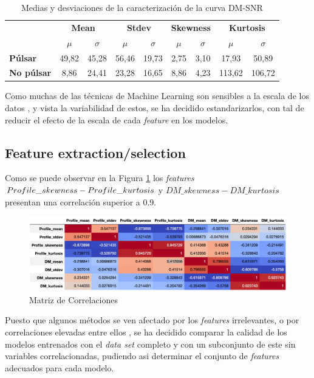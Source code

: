 \documentclass[a4paper]{article} %
\begin{document}
\begin{table}[H]
\centering
\begin{tabular}{l|c|c|c|c|c|c|c|c|}
\cline{2-9}
 & \multicolumn{2}{c|}{\textbf{Mean}} & \multicolumn{2}{c|}{\textbf{Stdev}} & \multicolumn{2}{c|}{\textbf{Skewness}} & \multicolumn{2}{c|}{\textbf{Kurtosis}} \\ \cline{2-9} 
 & $\mu$ & $\sigma$ & $\mu$ & $\sigma$ & $\mu$ & $\sigma$ & $\mu$ & $\sigma$ \\ \hline
\multicolumn{1}{|l|}{\textbf{Púlsar}} & 49,82 & 45,28 & 56,46 & 19,73 & 2,75 & 3,10 & 17,93 & 50,89 \\ \hline
\multicolumn{1}{|l|}{\textbf{No púlsar}} & 8,86 & 24,41 & 23,28 & 16,65 & 8,86 & 4,23 & 113,62 & 106,72 \\ \hline
\end{tabular}
\caption{Medias y desviaciones de la caracterización de la curva DM-SNR}
\label{StadisticsCurve}
\end{table}

Como muchas de las técnicas de Machine Learning son sensibles a la escala de los datos \cite{Grus}, y vista la variabilidad de estos, se ha decidido estandarizarlos, con tal de reducir el efecto de la escala de cada \textit{feature} en los modelos.

\subsection{Feature extraction/selection}
Como se puede observar en la Figura \ref{CorrMatrix} los \textit{features} $Profile\_skewness\\-Profile\_kurtosis$ y $DM\_skewness-DM\_kurtosis$ presentan una correlación superior a 0.9.\vspace{5mm}

\begin{figure}[H]
    \centering
    \includegraphics[width=1.0\textwidth]{CorrelationMatrix.png}
    \caption{Matriz de Correlaciones}
    \label{CorrMatrix}
\end{figure}

Puesto que algunos métodos se ven afectado por los \textit{features} irrelevantes, o por correlaciones elevadas entre ellos \cite{Kotsiantis14}, se ha decidido comparar la calidad de los modelos entrenados con el \textit{data set} completo y con un subconjunto de este sin variables correlacionadas, pudiendo asi determinar el conjunto de \textit{features} adecuados para cada modelo.\vspace{5mm}
\end{document}
